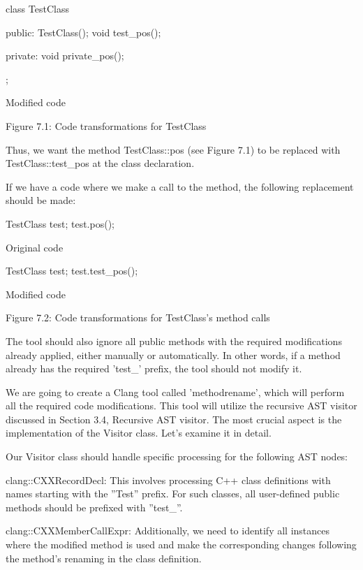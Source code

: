\begin{cpp}
class TestClass {
public:
  TestClass(){};
  void test_pos(){};

private:
  void private_pos(){};
};
\end{cpp}

Modified code

\begin{center}
Figure 7.1: Code transformations for TestClass
\end{center}


Thus, we want the method TestClass::pos (see Figure 7.1) to be replaced with TestClass::test\_pos at the class declaration.

If we have a code where we make a call to the method, the following replacement should be made:

\begin{cpp}
TestClass test;
test.pos();
\end{cpp}

Original code

\begin{cpp}
TestClass test;
test.test_pos();
\end{cpp}

Modified code


\begin{center}
Figure 7.2: Code transformations for TestClass’s method calls
\end{center}

The tool should also ignore all public methods with the required modifications already applied, either manually or automatically. In other words, if a method already has the required ’test\_’ prefix, the tool should not modify it.

We are going to create a Clang tool called ’methodrename’, which will perform all the required code modifications. This tool will utilize the recursive AST visitor discussed in Section 3.4, Recursive AST visitor. The most crucial aspect is the implementation of the Visitor class. Let’s examine it in detail.


Our Visitor class should handle specific processing for the following AST nodes:

clang::CXXRecordDecl: This involves processing C++ class definitions with names starting with the ”Test” prefix. For such classes, all user-defined public methods should be prefixed with ”test\_”.

clang::CXXMemberCallExpr: Additionally, we need to identify all instances where the modified method is used and make the corresponding changes following the method’s renaming in the class definition.

